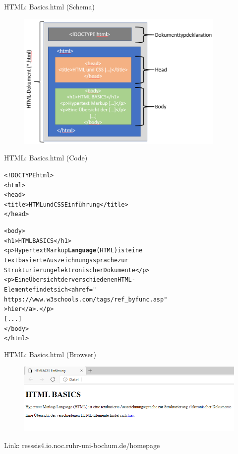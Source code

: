 \documentclass[xcolor=dvipsnames]{beamer}\usepackage[]{graphicx}\usepackage[]{color}
\makeatletter
\newcommand{\hlkwd}[1]{\textcolor[rgb]{0.737,0.353,0.396}{\textbf{#1}}}%
\newenvironment{kframe}{%
 \def\at@end@of@kframe{}%
 \ifinner\ifhmode%
  \def\at@end@of@kframe{\end{minipage}}%
  \begin{minipage}{\columnwidth}%
 \fi\fi%
 \def\FrameCommand##1{\hskip\@totalleftmargin \hskip-\fboxsep
 \colorbox{shadecolor}{##1}\hskip-\fboxsep
     \hskip-\linewidth \hskip-\@totalleftmargin \hskip\columnwidth}%
 \MakeFramed {\advance\hsize-\width
   \@totalleftmargin\z@ \linewidth\hsize
   \@setminipage}}%
 {\par\unskip\endMakeFramed%
 \at@end@of@kframe}
\newenvironment{knitrout}{}{} %
\makeatother
\begin{document}
\begin{frame}{HTML: Basics.html (Schema)}
  \begin{figure}
  	\centering
  	\includegraphics[width=0.9\textwidth]{figure/BasicHtml(Schema).png}
  \end{figure}
\end{frame}


\begin{frame}[fragile]{HTML: Basics.html (Code)}
\begin{knitrout}\small
{}\color{fgcolor}\begin{kframe}
\begin{alltt}
<!DOCTYPE html>
  <html>
    <head>
      <title>HTML und CSS Einführung</title>
    </head>
  
    <body>
      <h1>HTML BASICS</h1>
      <p>Hypertext Markup \hlkwd{Language} (HTML) ist eine
         textbasierte Auszeichnungssprache zur 
         Strukturierung elektronischer Dokumente</p>
      <p>Eine Übersicht der verschiedenen HTML-
         Elemente findet sich <a href="
         https://www.w3schools.com/tags/ref_byfunc.asp"
         >hier</a>.</p>
      [...]
    </body>
  </html>
\end{alltt}
\end{kframe}
\end{knitrout}
\end{frame}


\begin{frame}{HTML: Basics.html (Browser)}
  \begin{figure}
  	\centering
  	\includegraphics[width=1\textwidth]{figure/BasicHtml(Browser).png}
  \end{figure}
  Link: resssis4.io.noc.ruhr-uni-bochum.de/homepage
\end{frame}
\end{document}
